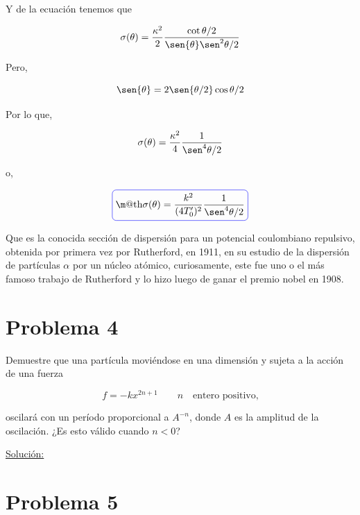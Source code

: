 \documentclass[a4paper,10pt]{article}
\makeatletter
\numberwithin{equation}{section}
\newcommand*{\boxcolor}{blue}
\renewcommand{\boxed}[1]{\textcolor{\boxcolor}{%
\tikz[baseline={([yshift=-1ex]current bounding box.center)}] \node [rectangle, minimum width=1ex,rounded corners,draw] {\normalcolor\m@th$\displaystyle#1$};}}
\makeatother
\begin{document}
Y de la ecuación  tenemos que 

\begin{equation}
 \sigma (\theta) = \frac{\kappa^2}{2}\frac{\cot{\theta/2}}{\sen{\theta}\sen^2{\theta/2}}
\end{equation}

Pero,

\begin{equation}
 \sen{\theta} = 2\sen{\theta/2}\cos{\theta/2}
\end{equation}

Por lo que,

\begin{equation}
  \sigma (\theta) = \frac{\kappa^2}{4}\frac{1}{\sen^4{\theta/2}}
\end{equation}

o,

\begin{equation}
 \boxed{\sigma (\theta) = \frac{k^2}{(4T_0')^2}\frac{1}{\sen^4{\theta/2}}}
\end{equation}

Que es la conocida sección de dispersión para un potencial coulombiano repulsivo,
obtenida por primera vez por Rutherford, en 1911, en su estudio de la dispersión de 
partículas $\alpha$ por un núcleo atómico, curiosamente, este fue uno o el más famoso
trabajo de Rutherford y lo hizo luego de ganar el premio nobel en 1908.












\section{Problema 4}

Demuestre que una partícula moviéndose en una dimensión y sujeta a la 
acción de una fuerza 

$$ 
f = -kx^{2n+1} \qquad n \quad \text{entero positivo,}
$$

oscilará con un período proporcional a $A^{-n}$, donde $A$ es la amplitud 
de la oscilación. ¿Es esto válido cuando $n<0$?

\vspace{.3cm}

\underline{Solución:} \vspace{.3cm}

\section{Problema 5}
\end{document}
